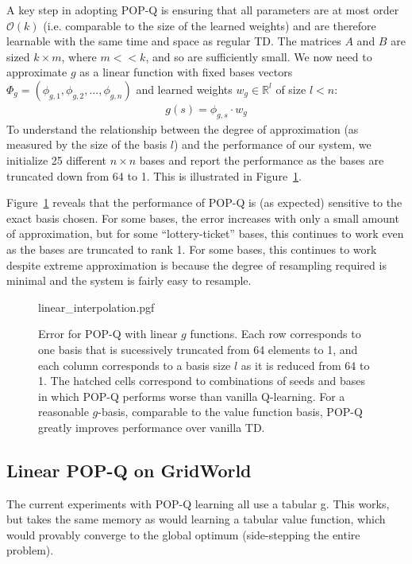 A key step in adopting POP-Q is ensuring that all parameters are at most order $\mathcal O(k)$ (i.e. comparable to the size of the learned weights) and are therefore learnable with the same time and space as regular TD. The matrices $A$ and $B$ are sized $k\times m$, where $m << k$, and so are sufficiently small. We now need to approximate $g$ as a linear function with fixed bases vectors $\Phi_g = (\phi_{g,1}, \phi_{g,2}, ..., \phi_{g,n})$ and learned weights $w_g \in \mathbb R^{l}$ of size $l < n$:
\begin{align}
  g(s) = \phi_{g, s} \cdot w_g
\end{align}
To understand the relationship between the degree of approximation (as measured by the size of the basis $l$) and the performance of our system, we initialize 25 different $n\times n$ bases and report the performance as the bases are truncated down from 64 to 1. This is illustrated in Figure~\ref{fig:linearerr}.

Figure~\ref{fig:linearerr} reveals that the performance of POP-Q is (as expected) sensitive to the exact basis chosen. For some bases, the error increases with only a small amount of approximation, but for some ``lottery-ticket'' bases, this continues to work even as the bases are truncated to rank 1. For some bases, this continues to work despite  extreme approximation is because the degree of resampling required is minimal and the system is fairly easy to resample.


\label{sec:explinearoffpolicy}
\begin{figure}[t]
  \centering
  {linear_interpolation.pgf}
  \caption{Error for POP-Q with linear $g$ functions. Each row corresponds to one basis that is sucessively truncated from 64 elements to 1, and each column corresponds to a basis size $l$ as it is reduced from 64 to 1. The hatched cells correspond to combinations of seeds and bases in which POP-Q performs worse than vanilla Q-learning. For a reasonable $g$-basis, comparable to the value function basis, POP-Q greatly improves performance over vanilla TD. }
  \label{fig:linearerr}
\end{figure}


\subsection{Linear POP-Q on GridWorld}

The current experiments with POP-Q learning all use a tabular g. This works, but takes the same memory as would learning a tabular value function, which would provably converge to the global optimum (side-stepping the entire problem).

